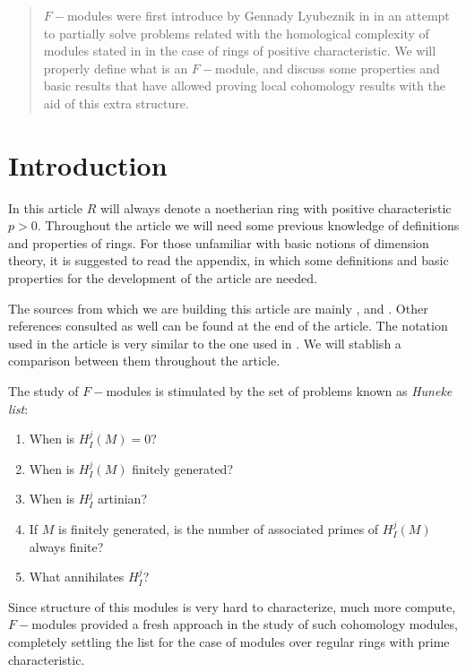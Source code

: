 \documentclass[leqno]{article}
\theoremstyle{definition}
\begin{document}
\newpage

\begin{abstract}
  $F-$modules were first introduce by Gennady Lyubeznik in \cite{lyu97} in an attempt to partially solve problems related with the homological complexity of modules stated in \cite{hun92} in the case of rings of positive characteristic. We will properly define what is an  $F-$module, and discuss some properties and basic results that have allowed proving local cohomology results with the aid of this extra structure.
\end{abstract}

\section{Introduction}

In this article $R$ will always denote a noetherian ring with positive characteristic $p>0$. Throughout the article we will need some previous knowledge of definitions and properties of rings. For those unfamiliar with basic notions of dimension theory, it is suggested to read the appendix, in which some definitions and basic properties for the development of the article are needed.

The sources from which we are building this article are mainly \cite{quingles}, \cite{blickle} and \cite{lyu97}. Other references consulted as well can be found at the end of the article. The notation used in the article is very similar to the one used in \cite{quingles}. We will stablish a comparison between them throughout the article.

The study of $F-$modules is stimulated by the set of problems known as \textit{Huneke list}:
\begin{enumerate}[topsep=-6pt, itemsep=0pt]
  \item When is $H_I^j(M)=0$?
  \item When is  $H_I^j(M)$ finitely generated? 
  \item When is $H_{I}^j$ artinian?
  \item If  $M$ is finitely generated, is the number of associated primes of  $H_I^j(M)$ always finite?
  \item What annihilates  $H_I^j$?
\end{enumerate}

Since structure of this modules is very hard to characterize, much more compute, $F-$modules provided a fresh approach in the study of such cohomology modules, completely settling the list for the case of modules over regular rings with prime characteristic.
\end{document}
